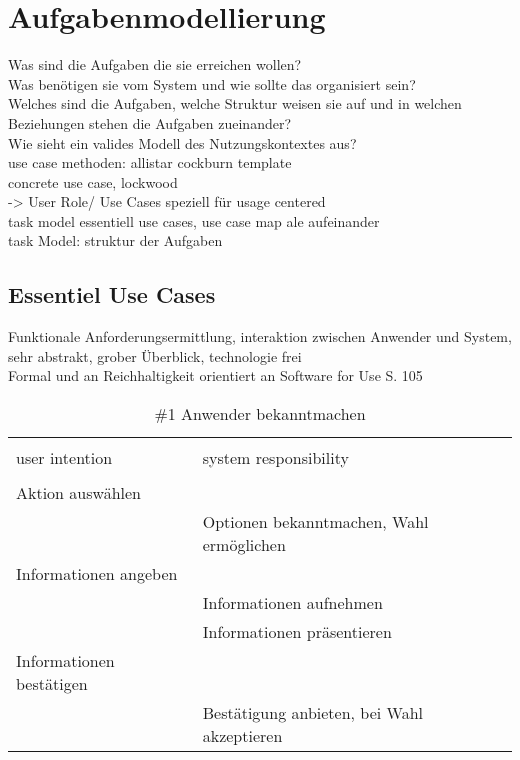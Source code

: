 
\section{Aufgabenmodellierung}

Was sind die Aufgaben die sie erreichen wollen?\\
Was benötigen sie vom System und wie sollte das organisiert sein?\\
Welches sind die Aufgaben, welche Struktur weisen sie auf und in welchen Beziehungen stehen die Aufgaben zueinander?\\
Wie sieht ein valides Modell des Nutzungskontextes aus?\\

use case methoden: allistar cockburn template \\
concrete use case, lockwood\\


-> User Role/ Use Cases speziell für usage centered	\\
task model essentiell use cases, use case map ale aufeinander\\

task Model: struktur der Aufgaben\\


\subsection{Essentiel Use Cases}
Funktionale Anforderungsermittlung, interaktion zwischen Anwender und System, sehr abstrakt, grober Überblick, technologie frei\\
Formal und an Reichhaltigkeit orientiert an Software for Use S. 105

\begin{table}[H]
\caption{\#1 Anwender bekanntmachen }
\centering
\begin{tabular}{l l}
\\ [-0.5ex]

\hline\hline
\\ [-0.5ex]
user intention & system responsibility
\\ [1.5ex]
\hline
\\ [-0.5ex]
Aktion auswählen 			& 											\\[1ex]
							& Optionen bekanntmachen, Wahl ermöglichen	\\[1ex]
Informationen angeben 		& 											\\[1ex] 
							& Informationen aufnehmen					\\[1ex]
							& Informationen präsentieren				\\[1ex]
Informationen bestätigen	& 											\\[1ex]
							& Bestätigung anbieten, bei Wahl akzeptieren \\[1ex]


\hline
\end{tabular}
\label{tab:anmelden}
\end{table}

